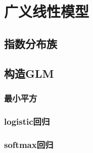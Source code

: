 \section{广义线性模型}

\subsection{指数分布族}

\subsection{构造GLM}

\subsubsection{最小平方}

\subsubsection{logistic回归}

\subsubsection{softmax回归}

